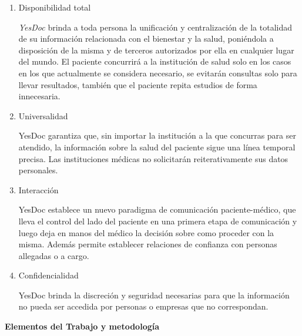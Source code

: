 \documentclass[a4paper,twocolumn,12pt]{article}
\begin{document}
\begin{enumerate}
    \item Disponibilidad total

        \textit{YesDoc} brinda a toda persona la unificación y centralización de la totalidad de su información relacionada con el bienestar y la salud, poniéndola a disposición de la misma y de terceros autorizados por ella en cualquier lugar del mundo.
        El paciente concurrirá a la institución de salud solo en los casos en los que actualmente se considera necesario, se evitarán consultas solo para llevar resultados, también que el paciente repita estudios de forma innecesaria.

    \item Universalidad

        YesDoc garantiza que, sin importar la institución a la que concurras para ser atendido, la información sobre la salud del paciente sigue una línea temporal precisa. Las instituciones médicas no solicitarán reiterativamente sus datos personales. %

    \item Interacción

        YesDoc establece un nuevo paradigma de comunicación paciente-médico, que lleva el control del lado del paciente en una primera etapa de comunicación y luego deja en manos del médico la decisión sobre como proceder con la misma. Además permite establecer relaciones de confianza con personas allegadas o a cargo. %

    \item Confidencialidad

        YesDoc brinda la discreción y seguridad necesarias para que la información no pueda ser accedida por personas o empresas que no correspondan.
\end{enumerate}



\vspace{3mm}
\textbf{Elementos del Trabajo y metodología}
\end{document}
